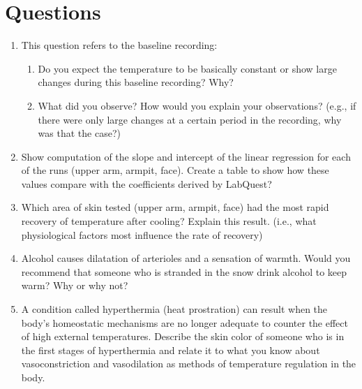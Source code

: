 \documentclass[12pt,oneside]{article}
\begin{document}
\begin{enumerate}
\end{enumerate}

\section{Questions}
\begin{enumerate}
\item   This question refers to the baseline recording:
\begin{enumerate}
\item   Do you expect the temperature to be basically constant or show large changes during this baseline recording?  Why?
\item   What did you observe?  How would you explain your observations? (e.g., if there were only large changes at a certain period in the recording, why was that the case?)
\end{enumerate}
\item   Show computation of the slope and intercept of the linear regression for each of the runs (upper arm, armpit, face).  Create a table to show how these values compare with the coefficients derived by LabQuest?
\item   Which area of skin tested (upper arm, armpit, face) had the most rapid recovery of temperature after cooling? Explain this result. (i.e., what physiological factors most influence the rate of recovery)
\item   Alcohol causes dilatation of arterioles and a sensation of warmth. Would you recommend that someone who is stranded in the snow drink alcohol to keep warm? Why or why not?
\item   A condition called hyperthermia (heat prostration) can result when the body’s homeostatic mechanisms are no longer adequate to counter the effect of high external temperatures. Describe the skin color of someone who is in the first stages of hyperthermia and relate it to what you know about vasoconstriction and vasodilation as methods of temperature regulation in the body.
\end{enumerate}
\end{document}
